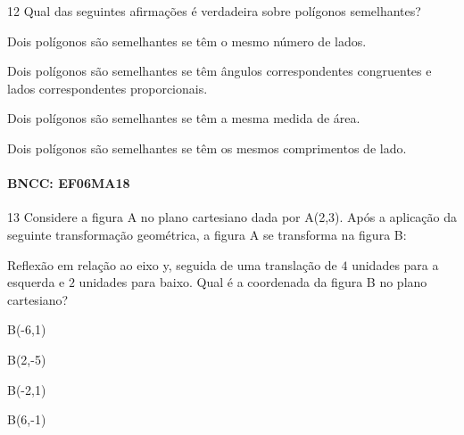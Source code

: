 \num{12} Qual das seguintes afirmações é verdadeira sobre polígonos
semelhantes?

\begin{escolha}
\item Dois polígonos são semelhantes se têm o mesmo número de lados.
\item Dois polígonos são semelhantes se têm ângulos correspondentes
congruentes e lados correspondentes proporcionais.
\item Dois polígonos são semelhantes se têm a mesma medida de área.
\item Dois polígonos são semelhantes se têm os mesmos comprimentos de lado.
\end{escolha}

\paragraph{BNCC: EF06MA18}


\num{13} Considere a figura A no plano cartesiano dada por A(2,3). Após a
aplicação da seguinte transformação geométrica, a figura A se transforma
na figura B:

Reflexão em relação ao eixo y, seguida de uma translação de $4$ unidades
para a esquerda e $2$ unidades para baixo. Qual é a coordenada da figura B no plano cartesiano?

\begin{escolha}
\item B(-6,1)
\item B(2,-5)
\item B(-2,1)
\item B(6,-1)
\end{escolha}

